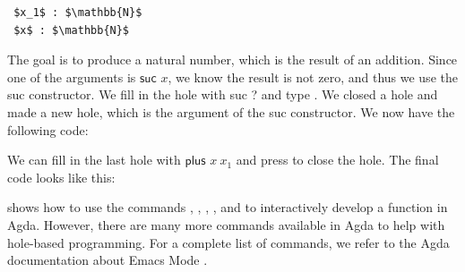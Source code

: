 \begin{example}
\begin{lstlisting}
 $x_1$ : $\mathbb{N}$
 $x$ : $\mathbb{N}$
  \end{lstlisting}
 The goal is to produce a natural number, which is the result of an addition. Since one of the arguments is $\textsf{suc } x$, we know the result is not zero, 
 and thus we use the \textsf{suc} constructor.
 We fill in the hole with \textsf{suc ?} and type .
 We closed a hole and made a new hole, which is the argument of the \textsf{suc} constructor. We now have the following code:
  
  \unskip\noindent
 We can fill in the last hole with $\textsf{plus } x \ x_1$ and press  to close the hole.
 The final code looks like this:
  
\end{example}

 shows how to use the commands , , , , and  to interactively develop a function in Agda.
However, there are many more commands available in Agda to help with hole-based programming.
For a complete list of commands, we refer to the Agda documentation about Emacs Mode \cite{agda-emacs-mode}.
